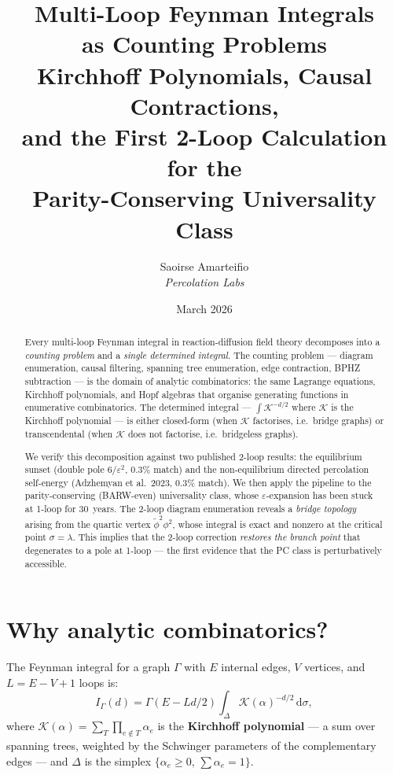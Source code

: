 \documentclass[11pt,a4paper]{article}
\title{%
\textbf{Multi-Loop Feynman Integrals\\
as Counting Problems}\\[0.4em]
\large Kirchhoff Polynomials, Causal Contractions,\\
and the First 2-Loop Calculation for the\\
Parity-Conserving Universality Class
}
\author{Saoirse Amarteifio \\ \small\textit{Percolation Labs}}
\date{March 2026}
\theoremstyle{definition}
\newcommand{\dd}{\mathrm{d}}
\newcommand{\phit}{\tilde\phi}
\newcommand{\K}{\mathcal{K}}
\begin{document}
\maketitle

\begin{abstract}
Every multi-loop Feynman integral in reaction-diffusion field theory
decomposes into a \emph{counting problem} and a \emph{single determined
integral}. The counting problem --- diagram enumeration, causal
filtering, spanning tree enumeration, edge contraction, BPHZ subtraction
--- is the domain of analytic combinatorics: the same Lagrange equations,
Kirchhoff polynomials, and Hopf algebras that organise generating
functions in enumerative combinatorics. The determined integral ---
$\int \K^{-d/2}$ where $\K$ is the Kirchhoff polynomial --- is
either closed-form (when $\K$ factorises, i.e.\ bridge graphs) or
transcendental (when $\K$ does not factorise, i.e.\ bridgeless graphs).

We verify this decomposition against two published 2-loop results:
the equilibrium sunset (double pole $6/\varepsilon^2$, 0.3\% match)
and the non-equilibrium directed percolation self-energy
(Adzhemyan et al.\ 2023, 0.3\% match). We then apply the pipeline
to the parity-conserving (BARW-even) universality class, whose
$\varepsilon$-expansion has been stuck at 1-loop for 30~years.
The 2-loop diagram enumeration reveals a \emph{bridge topology}
arising from the quartic vertex $\phit^2\phi^2$, whose integral
is exact and nonzero at the critical point $\sigma = \lambda$.
This implies that the 2-loop correction \emph{restores the branch
point} that degenerates to a pole at 1-loop --- the first evidence
that the PC class is perturbatively accessible.
\end{abstract}

\tableofcontents
\clearpage

\section{Why analytic combinatorics?}
\label{sec:why_ac}

The Feynman integral for a graph $\Gamma$ with $E$ internal edges,
$V$ vertices, and $L = E - V + 1$ loops is:
\begin{equation}
I_\Gamma(d) = \Gamma(E - Ld/2)
\int_\Delta \K(\alpha)^{-d/2}\,\dd\sigma,
\label{eq:parametric}
\end{equation}
where $\K(\alpha) = \sum_T \prod_{e \notin T} \alpha_e$ is the
\textbf{Kirchhoff polynomial} --- a sum over spanning trees, weighted
by the Schwinger parameters of the complementary edges --- and
$\Delta$ is the simplex $\{\alpha_e \geq 0,\, \sum \alpha_e = 1\}$.
\end{document}
